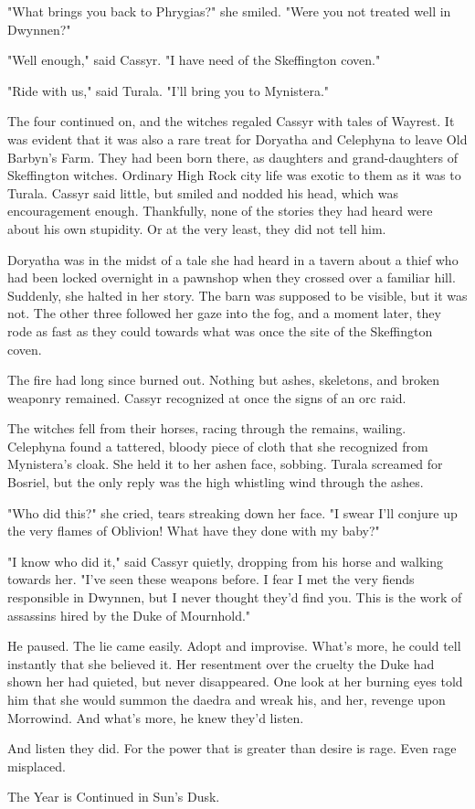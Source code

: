 "What brings you back to Phrygias?" she smiled. "Were you not treated well in Dwynnen?"

"Well enough," said Cassyr. "I have need of the Skeffington coven."

"Ride with us," said Turala. "I'll bring you to Mynistera."

The four continued on, and the witches regaled Cassyr with tales of Wayrest. It was evident that it was also a rare treat for Doryatha and Celephyna to leave Old Barbyn's Farm. They had been born there, as daughters and grand-daughters of Skeffington witches. Ordinary High Rock city life was exotic to them as it was to Turala. Cassyr said little, but smiled and nodded his head, which was encouragement enough. Thankfully, none of the stories they had heard were about his own stupidity. Or at the very least, they did not tell him.

Doryatha was in the midst of a tale she had heard in a tavern about a thief who had been locked overnight in a pawnshop when they crossed over a familiar hill. Suddenly, she halted in her story. The barn was supposed to be visible, but it was not. The other three followed her gaze into the fog, and a moment later, they rode as fast as they could towards what was once the site of the Skeffington coven.

The fire had long since burned out. Nothing but ashes, skeletons, and broken weaponry remained. Cassyr recognized at once the signs of an orc raid.

The witches fell from their horses, racing through the remains, wailing. Celephyna found a tattered, bloody piece of cloth that she recognized from Mynistera's cloak. She held it to her ashen face, sobbing. Turala screamed for Bosriel, but the only reply was the high whistling wind through the ashes.

"Who did this?" she cried, tears streaking down her face. "I swear I'll conjure up the very flames of Oblivion! What have they done with my baby?"

"I know who did it," said Cassyr quietly, dropping from his horse and walking towards her. "I've seen these weapons before. I fear I met the very fiends responsible in Dwynnen, but I never thought they'd find you. This is the work of assassins hired by the Duke of Mournhold."

He paused. The lie came easily. Adopt and improvise. What's more, he could tell instantly that she believed it. Her resentment over the cruelty the Duke had shown her had quieted, but never disappeared. One look at her burning eyes told him that she would summon the daedra and wreak his, and her, revenge upon Morrowind. And what's more, he knew they'd listen.

And listen they did. For the power that is greater than desire is rage. Even rage misplaced.

The Year is Continued in Sun's Dusk.